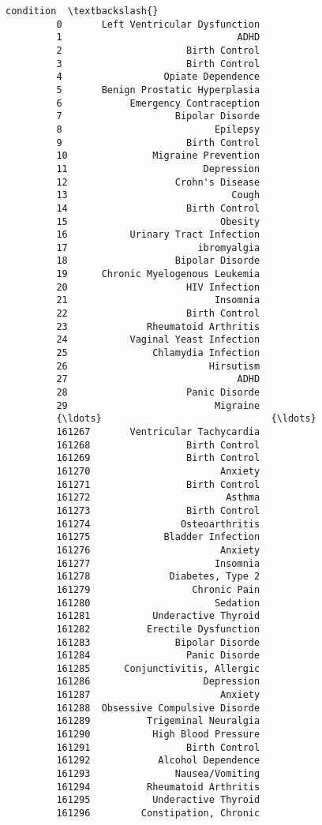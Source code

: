 \documentclass[11pt]{article}
\begin{document}
\begin{Verbatim}[commandchars=\\\{\}]
                                    condition  \textbackslash{}
         0       Left Ventricular Dysfunction   
         1                               ADHD   
         2                      Birth Control   
         3                      Birth Control   
         4                  Opiate Dependence   
         5       Benign Prostatic Hyperplasia   
         6            Emergency Contraception   
         7                    Bipolar Disorde   
         8                           Epilepsy   
         9                      Birth Control   
         10               Migraine Prevention   
         11                        Depression   
         12                   Crohn's Disease   
         13                             Cough   
         14                     Birth Control   
         15                           Obesity   
         16           Urinary Tract Infection   
         17                       ibromyalgia   
         18                   Bipolar Disorde   
         19      Chronic Myelogenous Leukemia   
         20                     HIV Infection   
         21                          Insomnia   
         22                     Birth Control   
         23              Rheumatoid Arthritis   
         24           Vaginal Yeast Infection   
         25               Chlamydia Infection   
         26                         Hirsutism   
         27                              ADHD   
         28                     Panic Disorde   
         29                          Migraine   
         {\ldots}                              {\ldots}   
         161267       Ventricular Tachycardia   
         161268                 Birth Control   
         161269                 Birth Control   
         161270                       Anxiety   
         161271                 Birth Control   
         161272                        Asthma   
         161273                 Birth Control   
         161274                Osteoarthritis   
         161275             Bladder Infection   
         161276                       Anxiety   
         161277                      Insomnia   
         161278              Diabetes, Type 2   
         161279                  Chronic Pain   
         161280                      Sedation   
         161281           Underactive Thyroid   
         161282          Erectile Dysfunction   
         161283               Bipolar Disorde   
         161284                 Panic Disorde   
         161285      Conjunctivitis, Allergic   
         161286                    Depression   
         161287                       Anxiety   
         161288  Obsessive Compulsive Disorde   
         161289          Trigeminal Neuralgia   
         161290           High Blood Pressure   
         161291                 Birth Control   
         161292            Alcohol Dependence   
         161293               Nausea/Vomiting   
         161294          Rheumatoid Arthritis   
         161295           Underactive Thyroid   
         161296         Constipation, Chronic   
         

\end{Verbatim}
\end{document}
